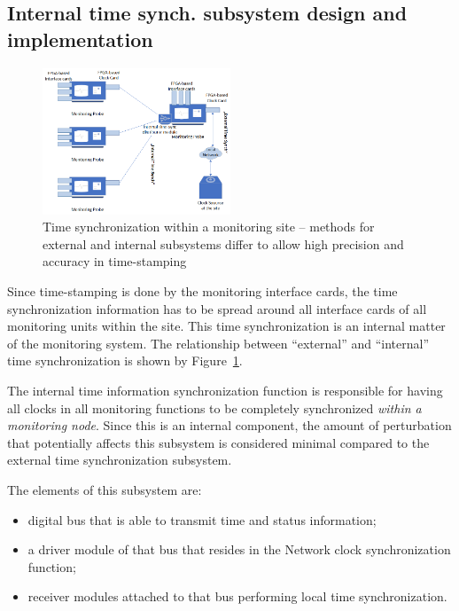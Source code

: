 \documentclass[journal]{IEEEtran}
\begin{document}
\subsection{Internal time synch. subsystem design and implementation}\label{sec:Internal-Impl}

\begin{figure}[!htb]
    \centering
    \includegraphics[width=0.5\textwidth]{figures_raw/TimeSynch_distribution.png}
    \caption{Time synchronization within a monitoring site -- methods for external and internal subsystems differ to allow high precision and accuracy in time-stamping}
    \label{fig:TymeSinchArch}
\end{figure}

Since time-stamping is done by the monitoring interface cards, the time synchronization information has to be spread around all interface cards of all monitoring units within the site. This time synchronization is an internal matter of the monitoring system. The relationship between ``external'' and ``internal'' time synchronization is shown by Figure~\ref{fig:TymeSinchArch}.

The internal time information synchronization function is responsible for having all clocks in all monitoring functions
to be completely synchronized \emph{within a monitoring node}. Since this is an internal component, the amount of perturbation
that potentially affects this subsystem is considered minimal compared to the external time synchronization subsystem.

The elements of this subsystem are:
\begin{itemize}
    \item digital bus that is able to transmit time and status information;
    \item a driver module of that bus that resides in the Network clock synchronization function;
    \item receiver modules attached to that bus performing local time synchronization.
\end{itemize}
\end{document}
